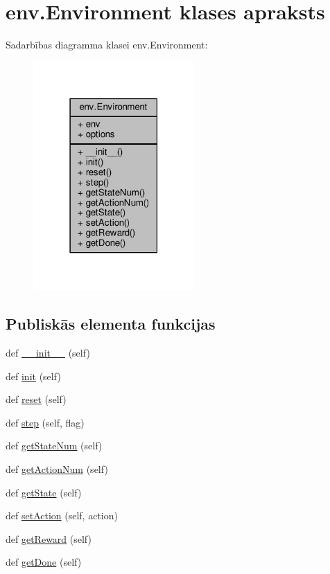 \hypertarget{classenv_1_1_environment}{}\section{env.\+Environment klases apraksts}
\label{classenv_1_1_environment}


Sadarbības diagramma klasei env.\+Environment\+:
\nopagebreak
\begin{figure}[H]
\begin{center}
\leavevmode
\includegraphics[width=174pt]{classenv_1_1_environment__coll__graph}
\end{center}
\end{figure}
\subsection*{Publiskās elementa funkcijas}
\begin{DoxyCompactItemize}
\item 
def \hyperlink{classenv_1_1_environment_ab43aa325dc7ec51e135ea24d2e6d8954}{\+\_\+\+\_\+init\+\_\+\+\_\+} (self)
\item 
def \hyperlink{classenv_1_1_environment_a8dd860a9d167e765134f08344a2c2d71}{init} (self)
\item 
def \hyperlink{classenv_1_1_environment_a33c77a544170cb422c7bcc6e257e9e66}{reset} (self)
\item 
def \hyperlink{classenv_1_1_environment_afb163b7692002933d860d3bd00a9e869}{step} (self, flag)
\item 
def \hyperlink{classenv_1_1_environment_a03b485c5cd7d6a33b0563fb074989b5f}{get\+State\+Num} (self)
\item 
def \hyperlink{classenv_1_1_environment_a33704b8916e5dbca53031fa89dd5ccb0}{get\+Action\+Num} (self)
\item 
def \hyperlink{classenv_1_1_environment_adbbb2aecb72314a5337fece8e433fe35}{get\+State} (self)
\item 
def \hyperlink{classenv_1_1_environment_a9cc0fbe9f5e1fbe3c49a3fb412d591d1}{set\+Action} (self, action)
\item 
def \hyperlink{classenv_1_1_environment_a3ed8a37b7b6c1279a10af783352335a6}{get\+Reward} (self)
\item 
def \hyperlink{classenv_1_1_environment_aa44deb3deae93e541af1d23523e28969}{get\+Done} (self)
\end{DoxyCompactItemize}
